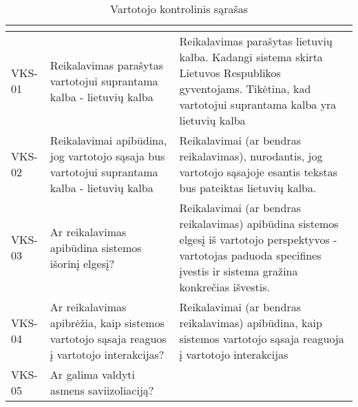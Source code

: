 \documentclass{VUMIFPSkursinis}
\begin{document}
\begin{center}

	\begin{longtable}{|C{2cm}|L{5cm}|L{8cm}|}

		\caption{Vartotojo kontrolinis sąrašas}
		\label{table:VKS}

		\\ \hline
		                                               &
		                                   &
		\\ \hline
		VKS-01                                                                                        &
		Reikalavimas parašytas vartotojui suprantama kalba - lietuvių kalba                           &
		Reikalavimas parašytas lietuvių kalba. Kadangi sistema skirta Lietuvos Respublikos gyventojams. Tikėtina, kad vartotojui suprantama kalba yra lietuvių kalba                                    \\ \hline
		VKS-02                                                                                        &
		Reikalavimai apibūdina, jog vartotojo sąsaja bus vartotojui suprantama kalba - lietuvių kalba &
		Reikalavimai (ar bendras reikalavimas), nurodantis, jog vartotojo sąsajoje esantis tekstas bus pateiktas lietuvių kalba.                                                                        \\ \hline
		VKS-03                                                                                        &
		Ar reikalavimas apibūdina sistemos išorinį elgesį?                                            &
		Reikalavimai (ar bendras reikalavimas) apibūdina sistemos elgesį iš vartotojo perspektyvos - vartotojas paduoda specifines įvestis ir sistema gražina konkrečias išvestis.                      \\ \hline
		VKS-04                                                                                        &
		Ar reikalavimas apibrėžia, kaip sistemos vartotojo sąsaja reaguos į vartotojo interakcijas?   &
		Reikalavimai (ar bendras reikalavimas) apibūdina, kaip sistemos vartotojo sąsaja reaguoja į vartotojo interakcijas                                                                              \\ \hline
		VKS-05                                                                                        &
		Ar galima valdyti asmens saviizoliaciją?                                                      &

\end{longtable}
\end{center}
\end{document}

